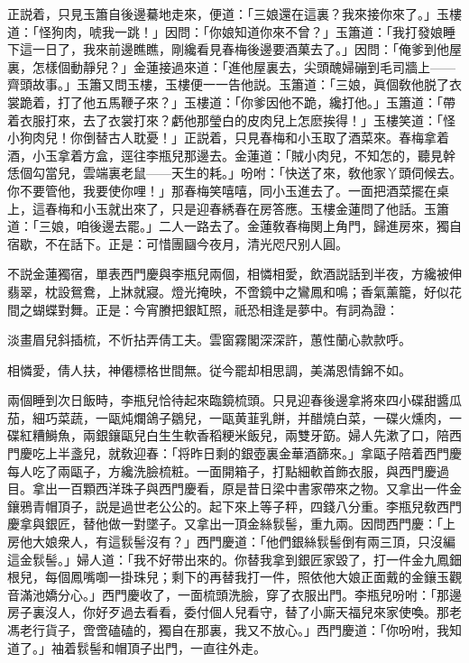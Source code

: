 正説着，只見玉簫自後邊驀地走來，便道：「三娘還在這裏？我來接你來了。」玉樓道：「怪狗肉，唬我一跳！」因問：「你娘知道你來不曾？」玉簫道：「我打發娘睡下這一日了，我來前邊瞧瞧，剛纔看見春梅後邊要酒菓去了。」因問：「俺爹到他屋裏，怎樣個動靜兒？」金蓮接過來道：「進他屋裏去，尖頭醜婦磞到毛司牆上——齊頭故事。」玉簫又問玉樓，玉樓便一一告他説。玉簫道：「三娘，眞個敎他脱了衣裳跪着，打了他五馬鞭子來？」玉樓道：「你爹因他不跪，纔打他。」玉簫道：「帶着衣服打來，去了衣裳打來？虧他那瑩白的皮肉兒上怎麽挨得！」玉樓笑道：「怪小狗肉兒！你倒替古人耽憂！」正説着，只見春梅和小玉取了酒菜來。春梅拿着酒，小玉拿着方盒，逕往李瓶兒那邊去。金蓮道：「賊小肉兒，不知怎的，聽見幹恁個勾當兒，雲端裏老鼠——天生的耗。」吩咐：「快送了來，敎他家丫頭伺候去。你不要管他，我要使你哩！」那春梅笑嘻嘻，同小玉進去了。一面把酒菜擺在桌上，這春梅和小玉就出來了，只是迎春綉春在房答應。玉樓金蓮問了他話。玉簫道：「三娘，咱後邊去罷。」二人一路去了。金蓮敎春梅関上角門，歸進房來，獨自宿歇，不在話下。正是：可惜團圝今夜月，清光咫尺别人圓。

不説金蓮獨宿，單表西門慶與李瓶兒兩個，相憐相愛，飲酒説話到半夜，方纔被伸翡翠，枕設鴛鴦，上牀就寢。燈光掩映，不啻鏡中之鸞鳳和鳴；香氣薰籠，好似花間之蝴蝶對舞。正是：今宵賸把銀缸照，祇恐相逢是夢中。有詞為證：

\begin{myquote}
淡畫眉兒斜插梳，不忻拈弄倩工夫。雲窗霧閣深深許，蕙性蘭心款款呼。

相憐愛，倩人扶，神僊標格世間無。従今罷却相思調，美滿恩情錦不如。
\end{myquote}

兩個睡到次日飯時，李瓶兒恰待起來臨鏡梳頭。只見迎春後邊拿將來四小碟甜醬瓜茄，細巧菜蔬，一甌炖爛鴿子鶵兒，一甌黄韮乳餅，并醋燒白菜，一碟火燻肉，一碟紅糟鰣魚，兩銀鑲甌兒白生生軟香稻粳米飯兒，兩雙牙筯。婦人先漱了口，陪西門慶吃上半盞兒，就敎迎春：「将昨日剩的銀壺裏金華酒篩來。」拿甌子陪着西門慶每人吃了兩甌子，方纔洗臉梳粧。一面開箱子，打點細軟首飾衣服，與西門慶過目。拿出一百顆西洋珠子與西門慶看，原是昔日梁中書家帶來之物。又拿出一件金鑲鴉青帽頂子，説是過世老公公的。起下來上等子秤，四錢八分重。李瓶兒敎西門慶拿與銀匠，替他做一對墜子。又拿出一頂金絲䯼髻，重九兩。因問西門慶：「上房他大娘衆人，有這䯼髻沒有？」西門慶道：「他們銀絲䯼髻倒有兩三頂，只沒編這金䯼髻。」婦人道：「我不好带出來的。你替我拿到銀匠家毀了，打一件金九鳳鈿根兒，每個鳳嘴啣一掛珠兒；剩下的再替我打一件，照依他大娘正面戴的金鑲玉觀音滿池嬌分心。」西門慶收了，一面梳頭洗臉，穿了衣服出門。李瓶兒吩咐：「那邊房子裏沒人，你好歹過去看看，委付個人兒看守，替了小廝天福兒來家使喚。那老馮老行貨子，啻啻磕磕的，獨自在那裏，我又不放心。」西門慶道：「你吩咐，我知道了。」袖着䯼髻和帽頂子出門，一直往外走。

